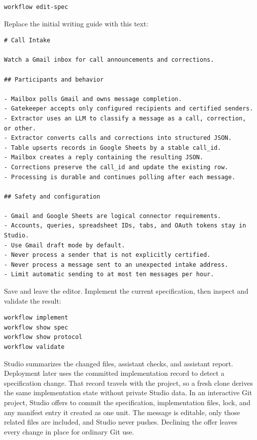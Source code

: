 \documentclass[11pt,a4paper]{article}
\begin{document}
\begin{lstlisting}[style=shell]
workflow edit-spec
\end{lstlisting}

Replace the initial writing guide with this text:

\begin{lstlisting}
# Call Intake

Watch a Gmail inbox for call announcements and corrections.

## Participants and behavior

- Mailbox polls Gmail and owns message completion.
- Gatekeeper accepts only configured recipients and certified senders.
- Extractor uses an LLM to classify a message as a call, correction, or other.
- Extractor converts calls and corrections into structured JSON.
- Table upserts records in Google Sheets by a stable call_id.
- Mailbox creates a reply containing the resulting JSON.
- Corrections preserve the call_id and update the existing row.
- Processing is durable and continues polling after each message.

## Safety and configuration

- Gmail and Google Sheets are logical connector requirements.
- Accounts, queries, spreadsheet IDs, tabs, and OAuth tokens stay in Studio.
- Use Gmail draft mode by default.
- Never process a sender that is not explicitly certified.
- Never process a message sent to an unexpected intake address.
- Limit automatic sending to at most ten messages per hour.
\end{lstlisting}

Save and leave the editor. Implement the current specification, then inspect
and validate the result:

\begin{lstlisting}[style=shell]
workflow implement
workflow show spec
workflow show protocol
workflow validate
\end{lstlisting}

Studio summarizes the changed files, assistant checks, and assistant report.
Deployment later uses the committed  implementation
record to detect a specification change. That record travels with the project,
so a fresh clone derives the same implementation state without private Studio
data. In an interactive Git project, Studio offers to commit the specification,
implementation files, lock, and any manifest entry it created as one unit. The
message is editable, only those related files are included, and Studio never
pushes. Declining the offer leaves every change in place for ordinary Git use.
\end{document}
